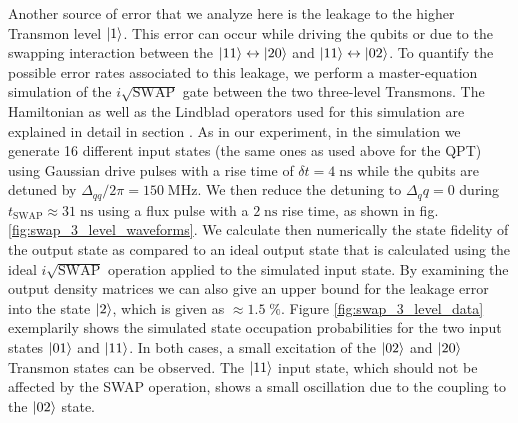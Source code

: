 Another source of error that we analyze here is the leakage to the higher Transmon level $\left| 1 \right>$. This error can occur while driving the qubits or due to the swapping interaction between the $\left| 11 \right>\leftrightarrow\left| 20 \right>$ and $\left| 11 \right>\leftrightarrow\left| 02 \right>$. To quantify the possible error rates associated to this leakage, we perform a master-equation simulation of the $i\sqrt{\mathrm{SWAP}}$ gate between the two three-level Transmons. The Hamiltonian as well as the Lindblad operators used for this simulation are explained in detail in section \label{section:three_level_simulation}. As in our experiment, in the simulation we generate 16 different input states (the same ones as used above for the QPT) using Gaussian drive pulses with a rise time of $\delta t = 4\;\mathrm{ns}$ while the qubits are detuned by $\Delta_{qq}/2\pi = 150\;\mathrm{MHz}$. We then reduce the detuning to $\Delta_qq = 0$ during $t_\mathrm{SWAP}\approx 31 \;\mathrm{ns}$ using a flux pulse with a $2\;\mathrm{ns}$ rise time, as shown in fig. \ref{fig:swap_3_level_waveforms}. We calculate then numerically the state fidelity of the output state as compared to an ideal output state that is calculated using the ideal $i\sqrt{\mathrm{SWAP}}$ operation applied to the simulated input state. By examining the output density matrices we can also give an upper bound for the leakage error into the state $\left| 2 \right>$, which is given as $\approx 1.5\;\%$. Figure \ref{fig:swap_3_level_data} exemplarily shows the simulated state occupation probabilities for the two input states $\left| 01 \right>$ and $\left| 11 \right>$. In both cases, a small excitation of the $\left| 02 \right>$ and $\left| 20 \right>$ Transmon states can be observed. The $\left| 11 \right>$ input state, which should not be affected by the SWAP operation, shows a small oscillation due to the coupling to the $\left| 02 \right>$ state.


